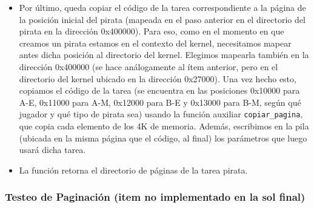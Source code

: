 \begin{itemize}
\item Por último, queda copiar el código de la tarea correspondiente a la página de la posición inicial del pirata (mapeada en el paso anterior en el directorio del pirata en la dirección 0x400000). Para eso, como en el momento en que creamos un pirata estamos en el contexto del kernel, necesitamos mapear antes dicha posición al directorio del kernel. Elegimos mapearla también en la dirección 0x400000 (se hace análogamente al ítem anterior, pero en el directorio del kernel ubicado en la dirección 0x27000). Una vez hecho esto, copiamos el código de la tarea (se encuentra en las posiciones 0x10000 para A-E, 0x11000 para A-M, 0x12000 para B-E y 0x13000 para B-M, según qué jugador y qué tipo de pirata sea) usando la función auxiliar \texttt{copiar_pagina}, que copia cada elemento de los 4K de memoria. Además, escribimos en la pila (ubicada en la misma página que el código, al final) los parámetros que luego usará dicha tarea.

\item La función retorna el directorio de páginas de la tarea pirata.

\end{itemize}


\subsubsection*{Testeo de Paginación (item no implementado en la sol final)}

\par 













